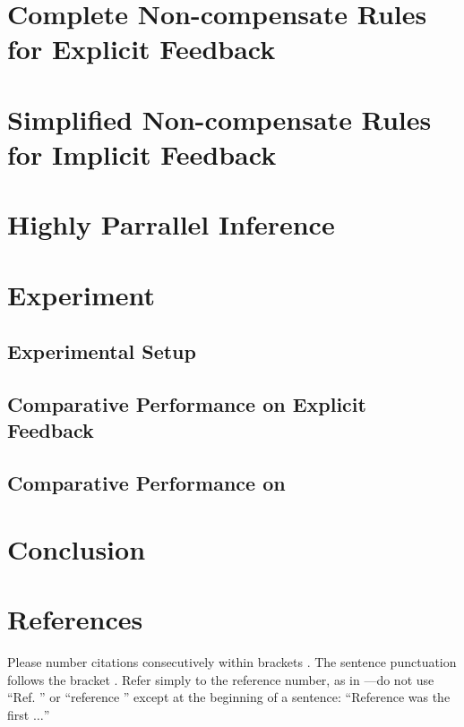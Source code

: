 \documentclass[conference]{IEEEtran}
\begin{document}


\section{Complete Non-compensate Rules for Explicit Feedback}\label{sec:model1}

\section{Simplified Non-compensate Rules for Implicit Feedback}\label{sec:model2}

\section{Highly Parrallel Inference}\label{sec:algorithm}

\section{Experiment}\label{sec:experiment}

\subsection{Experimental Setup}

\subsection{Comparative Performance on Explicit Feedback}

\subsection{Comparative Performance on }


\section{Conclusion}\label{sec:conclusion}
\section*{References}

Please number citations consecutively within brackets \cite{b1}. The 
sentence punctuation follows the bracket \cite{b2}. Refer simply to the reference 
number, as in \cite{b3}---do not use ``Ref. \cite{b3}'' or ``reference \cite{b3}'' except at 
the beginning of a sentence: ``Reference \cite{b3} was the first $\ldots$''
\end{document}

